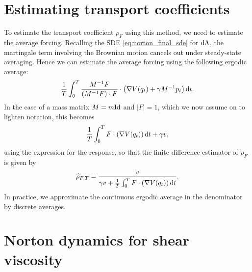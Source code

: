 \section{Estimating transport coefficients}
To estimate the transport coefficient $\rho_F$ using this method, we need to estimate the average forcing. Recalling the SDE \eqref{eq:norton_final_sde} for $\mathrm{d} \Lambda$, the martingale term involving the Brownian motion cancels out under steady-state averaging.
Hence we can estimate the average forcing using the following ergodic average:
\begin{equation}
    \label{eq:norton_ergodic_forcing}
    \frac{1}T\int_0^T\frac{M^{-1}F}{\left(M^{-1}F\right)\cdot F}\cdot\left(\nabla V(q_t)+\gamma M^{-1}p_t\right)\mathrm{d} t.
\end{equation}
In the case of a mass matrix $M=m\mathrm{Id}$ and $|F|=1$, which we now assume on to lighten notation, this becomes
\begin{equation}
    \label{eq:norton_ergodic_forcing_homogeneous}
    \frac{1}{T}\int_0^T F\cdot\left(\nabla V(q_t)\right)\mathrm{d} t + \gamma v,
\end{equation}
using the expression for the response, so that the finite difference estimator of $\rho_F$ is given by
\begin{equation}
    \label{eq:norton_transport estimator}
    \widehat{\rho}_{F,T}=\frac{v}{\gamma v+\frac{1}{T}\int_0^T F\cdot\left(\nabla V(q_t)\right)\mathrm{d} t}.
\end{equation}
In practice, we approximate the continuous ergodic average in the denominator by discrete averages.

\section{Norton dynamics for shear viscosity}

